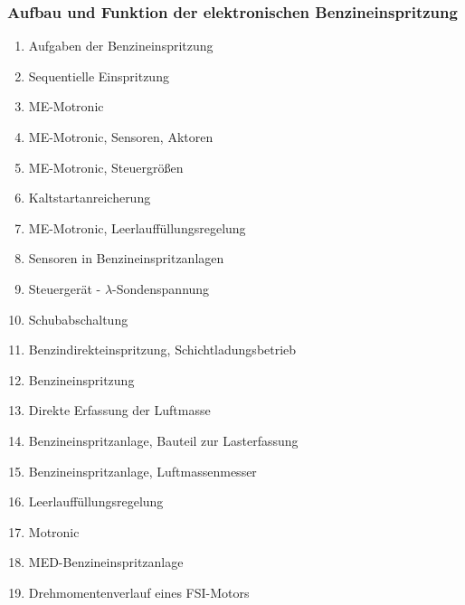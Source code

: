 \subsubsection{Aufbau und Funktion der elektronischen
Benzineinspritzung}\label{aufbau-und-funktion-der-elektronischen-benzineinspritzung}

\begin{enumerate}
\item
  Aufgaben der Benzineinspritzung\\
\item
  Sequentielle Einspritzung\\
\item
  ME-Motronic\\
\item
  ME-Motronic, Sensoren, Aktoren\\
\item
  ME-Motronic, Steuergrößen\\
\item
  Kaltstartanreicherung\\
\item
  ME-Motronic, Leerlauffüllungsregelung\\
\item
  Sensoren in Benzineinspritzanlagen\\
\item
  Steuergerät - $\lambda$-Sondenspannung\\
\item
  Schubabschaltung\\
\item
  Benzindirekteinspritzung, Schichtladungsbetrieb\\
\item
  Benzineinspritzung\\
\item
  Direkte Erfassung der Luftmasse\\
\item
  Benzineinspritzanlage, Bauteil zur Lasterfassung\\
\item
  Benzineinspritzanlage, Luftmassenmesser\\
\item
  Leerlauffüllungsregelung\\
\item
  Motronic\\
\item
  MED-Benzineinspritzanlage\\
\item
  Drehmomentenverlauf eines FSI-Motors\\

\end{enumerate}
